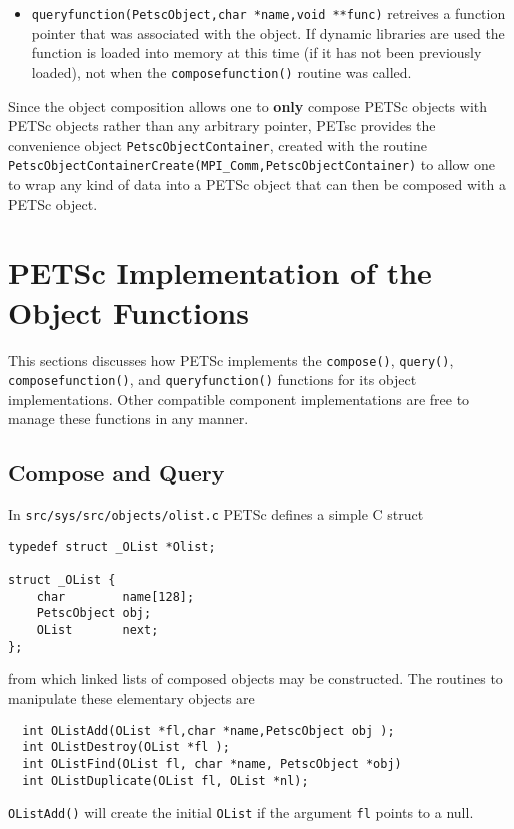 \begin{itemize}
\item {\tt queryfunction(PetscObject,char *name,void **func)} retreives a function pointer that
      was associated with the object. If dynamic libraries are used the function is loaded
      into memory at this time (if it has not been previously loaded), not when the
      {\tt composefunction()} routine was called.

\end{itemize}

Since the object composition allows one to {\bf only} compose PETSc objects
with PETSc objects rather than any arbitrary pointer, PETsc provides
the convenience object {\tt PetscObjectContainer}, created with the
routine {\tt PetscObjectContainerCreate(MPI\_Comm,PetscObjectContainer)}
to allow one to wrap any kind of data into a PETSc object that can then be
composed with a PETSc object.

\section{PETSc Implementation of the  Object Functions}

This sections discusses how PETSc implements the {\tt compose()}, {\tt query()}, {\tt
composefunction()}, and {\tt queryfunction()} functions for its object implementations. 
Other compatible component implementations are free to manage these functions in any 
manner.

\subsection{Compose and Query}

In {\tt src/sys/src/objects/olist.c} PETSc defines a simple C struct
\begin{verbatim}
typedef struct _OList *Olist;

struct _OList {
    char        name[128];
    PetscObject obj;
    OList       next;
};
\end{verbatim}
from which linked lists of composed objects may be constructed. The routines
to manipulate these elementary objects are
\begin{verbatim}
  int OListAdd(OList *fl,char *name,PetscObject obj );
  int OListDestroy(OList *fl );
  int OListFind(OList fl, char *name, PetscObject *obj)
  int OListDuplicate(OList fl, OList *nl);
\end{verbatim}
{\tt OListAdd()} will create the initial {\tt OList} if the argument {\tt fl} points
to a null.

